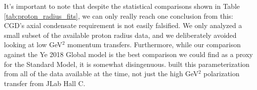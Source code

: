It's important to note that despite the statistical comparisons shown in Table \ref{tab:proton_radius_fits}, we can only really reach one conclusion from this: CGD's axial condensate requirement is not easily falsified. We only analyzed a small subset of the available proton radius data, and we deliberately avoided looking at low GeV$^2$ momentum transfers. Furthermore, while our comparison against the Ye 2018 Global model is the best comparison we could find as a proxy for the Standard Model, it is somewhat disingenuous. \citet{ye2018proton} built this parameterization from all of the data available at the time, not just the high GeV$^2$ polarization transfer from JLab Hall C.

